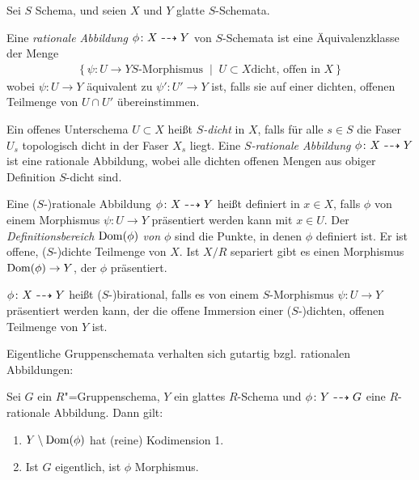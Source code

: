 \documentclass[german]{scrreprt}
\begin{document}
\begin{Definition}\label{def:ratabb}
  Sei $S$ Schema, und seien $X$ und $Y$ glatte $S$-Schemata.

  Eine \emph{rationale Abbildung} $\phi\colon X\dashrightarrow Y$ von
  $S$-Schemata ist eine Äquivalenzklasse der Menge
  \begin{gather*}
    \left\{
      \psi\colon U\to Y \text{$S$-Morphismus}
      \;\middle|\;
      U\subset X \text{dicht, offen in $X$}
    \right\}
  \end{gather*}
  wobei $\psi\colon U\to Y$ äquivalent zu $\psi'\colon U'\to Y$ ist,
  falls sie auf einer dichten, offenen Teilmenge von $U\cap U'$
  übereinstimmen.
  
  Ein offenes Unterschema $U\subset X$ heißt \emph{$S$-dicht} in $X$,
  falls für alle $s\in S$ die Faser $U_s$%
  topologisch dicht in der Faser $X_s$%
  liegt.
  Eine \emph{$S$-rationale Abbildung} $\phi\colon X\dashrightarrow Y$ ist eine
  rationale Abbildung, wobei alle dichten offenen Mengen aus obiger
  Definition $S$-dicht sind.

  Eine ($S$-)rationale Abbildung $\phi\colon X\dashrightarrow Y$ heißt definiert
  in $x\in X$, falls $\phi$ von einem Morphismus $\psi\colon U\to Y$
  präsentiert werden kann mit $x\in U$.
  Der \emph{Definitionsbereich $\operatorname{Dom}(\phi)$ von $\phi$} sind die
  Punkte, in denen $\phi$ definiert ist. Er ist offene, ($S$-)dichte
  Teilmenge von $X$. Ist $X/R$ separiert gibt es einen Morphismus
  $\operatorname{Dom}(\phi)\to Y$, der $\phi$ präsentiert.
  
  $\phi\colon X\dashrightarrow Y$ heißt ($S$-)birational, falls es von einem
  $S$-Morphismus $\psi\colon U\to Y$ präsentiert werden kann, der
  die offene Immersion einer ($S$-)dichten, offenen Teilmenge von $Y$
  ist.
\end{Definition}

Eigentliche Gruppenschemata verhalten sich gutartig bzgl. rationalen
Abbildungen: 
\begin{Lemma}\label{thm:rationalzumorphismus}
  \cite[Proposition IV.6.2]{silverman2}
  Sei $G$ ein $R$"=Gruppenschema, $Y$ ein glattes $R$-Schema und
  $\phi\colon Y\dashrightarrow G$ eine $R$-rationale Abbildung.
  Dann gilt:
  \begin{enumerate}[label=(\roman*)]
  \item $Y\setminus \operatorname{Dom}(\phi)$ hat (reine) Kodimension 1.
  \item Ist $G$ eigentlich, ist $\phi$ Morphismus.
  \end{enumerate}
\end{Lemma}
\end{document}
